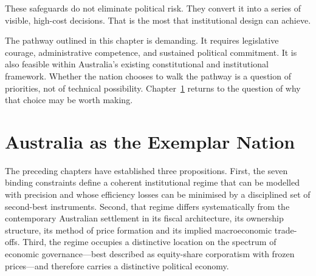 \documentclass[12pt,anyside]{book}
\theoremstyle{definition}
\theoremstyle{plain}
\theoremstyle{remark}
\begin{document}
These safeguards do not eliminate political risk. They convert it into a series of visible, high-cost decisions. That is the most that institutional design can achieve.

The pathway outlined in this chapter is demanding. It requires legislative courage, administrative competence, and sustained political commitment. It is also feasible within Australia’s existing constitutional and institutional framework. Whether the nation chooses to walk the pathway is a question of priorities, not of technical possibility. Chapter~\ref{ch:vision} returns to the question of why that choice may be worth making.

\chapter{Australia as the Exemplar Nation}
\label{ch:vision}

The preceding chapters have established three propositions. First, the seven binding constraints define a coherent institutional regime that can be modelled with precision and whose efficiency losses can be minimised by a disciplined set of second-best instruments. Second, that regime differs systematically from the contemporary Australian settlement in its fiscal architecture, its ownership structure, its method of price formation and its implied macroeconomic trade-offs. Third, the regime occupies a distinctive location on the spectrum of economic governance—best described as equity-share corporatism with frozen prices—and therefore carries a distinctive political economy.
\end{document}
